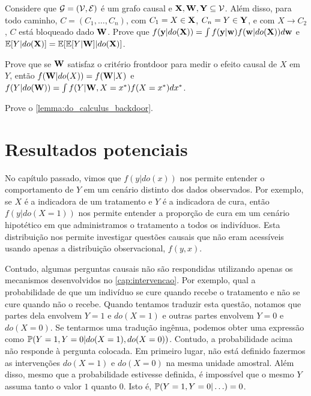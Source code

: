 \begin{exercise}
 Considere que $\sG = (\sV, \sE)$ é um grafo causal e
 $\X,\W,\Y \subseteq \sV$. Além disso,
 para todo caminho, $C = (C_1,\ldots,C_n)$,
 com $C_1 = X \in \X$, $C_n = Y \in \Y$, e
 com $X \rightarrow C_2$,
 $C$ está bloqueado dado $\W$.
 Prove que $f(\y|do(\X)) 
 = \int f(\y|\w)f(\w|do(\X))d\w$ e
 $\E[Y|do(\X)] = \E[\E[Y|\W]|do(\X)]$.
\end{exercise}

\begin{exercise}
 \label{lemma:frontdoor_backdoor}
 Prove que se $\W$ satisfaz o critério frontdoor para
 medir o efeito causal de $X$ em $Y$, então
 $f(\W|do(X)) = f(\W|X)$ e
 $f(Y|do(\W)) = \int f(Y|\W,X=x^*)f(X=x^*)dx^*$.
\end{exercise}

\begin{exercise}
 Prove o \cref{lemma:do_calculus_backdoor}.
\end{exercise}

\chapter{Resultados potenciais}

No capítulo passado, vimos que
$f(y|do(x))$ nos permite entender
o comportamento de $Y$ em 
um cenário distinto dos dados observados.
Por exemplo, se $X$ é 
a indicadora de um tratamento e
$Y$ é a indicadora de cura, então
$f(y|do(X=1))$ nos permite entender
a proporção de cura em um cenário hipotético em que
administramos o tratamento a todos os indivíduos.
Esta distribuição nos permite investigar
questões causais que 
não eram acessíveis usando apenas
a distribuição observacional, $f(y,x)$.

Contudo, algumas perguntas causais 
não são respondidas utilizando apenas
os mecanismos desenvolvidos no \cref{cap:intervencao}.
Por exemplo, qual a probabilidade de que 
um indivíduo se cure quando recebe o tratamento e
não se cure quando não o recebe.
Quando tentamos traduzir esta questão,
notamos que partes dela envolvem $Y=1$ e $do(X=1)$
e outras partes envolvem $Y=0$ e $do(X=0)$.
Se tentarmos uma tradução ingênua,
podemos obter uma expressão como $\P(Y=1, Y=0|do(X=1),do(X=0))$.
Contudo, a probabilidade acima não responde à pergunta colocada.
Em primeiro lugar, não está definido fazermos
as intervenções $do(X=1)$ e $do(X=0)$ na mesma unidade amostral.
Além disso, mesmo que a probabilidade estivesse definida,
é impossível que o mesmo $Y$ assuma tanto o valor $1$ quanto $0$.
Isto é, $\P(Y=1, Y=0|\ldots) = 0$.

